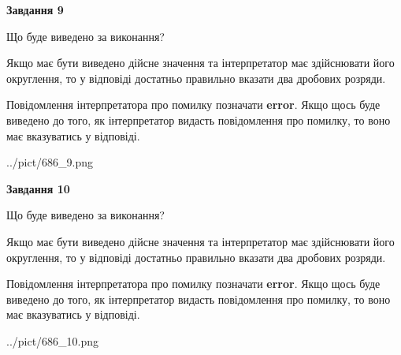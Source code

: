 \documentclass[12pt, ukrainian]{article}
\begin{document}
{\begin {Large}
{\begin {center}\textbf{Завдання 9}\end {center}}\par
Що буде виведено за виконання? \par

Якщо має бути виведено дійсне значення та інтерпретатор має здійснювати його округлення, 
то у відповіді достатньо правильно вказати два дробових розряди.

Повідомлення інтерпретатора про помилку позначати \textbf{error}.
Якщо щось буде виведено до того, як інтерпретатор видасть повідомлення про помилку, 
то воно має вказуватись у відповіді. \par

\begin{center}
	{../pict/686_9.png}
\end{center}
\newpage

{\begin {center}\textbf{Завдання 10}\end {center}}\par
Що буде виведено за виконання? \par

Якщо має бути виведено дійсне значення та інтерпретатор має здійснювати його округлення, 
то у відповіді достатньо правильно вказати два дробових розряди.

Повідомлення інтерпретатора про помилку позначати \textbf{error}.
Якщо щось буде виведено до того, як інтерпретатор видасть повідомлення про помилку, 
то воно має вказуватись у відповіді. \par

\begin{center}
	{../pict/686_10.png}
\end{center}
\newpage

\end {Large}}
\end{document}
